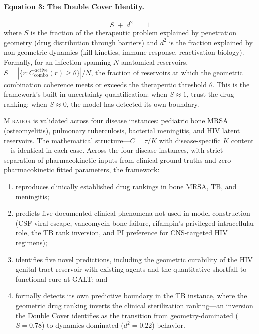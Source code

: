 \documentclass[11pt]{article}
\theoremstyle{plain}
\theoremstyle{definition}
\newcommand{\mirador}{\textsc{Mirador}}
\newcommand{\Ccombo}{C_{\mathrm{combo}}}
\begin{document}
\paragraph{Equation 3: The Double Cover Identity.}
%
\begin{equation}
  \label{eq:double-cover-preview}
  \boxed{\;S \;+\; d^2 \;=\; 1\;}
\end{equation}
%
where $S$ is the fraction of the therapeutic problem explained by
penetration geometry (drug distribution through barriers) and $d^2$
is the fraction explained by non-geometric dynamics (kill kinetics,
immune response, reactivation biology). Formally, for an infection
spanning $N$ anatomical reservoirs,
$S = |\{r : \Ccombo^{\,\mathrm{active}}(r) \geq \theta\}| / N$,
the fraction of reservoirs at which the geometric combination
coherence meets or exceeds the therapeutic threshold $\theta$.
This is the framework's built-in uncertainty quantification: when
$S \approx 1$, trust the drug ranking; when $S \approx 0$, the
model has detected its own boundary.

\medskip

\mirador{} is validated across four disease instances: pediatric bone
MRSA (osteomyelitis), pulmonary tuberculosis, bacterial meningitis,
and HIV latent reservoirs. The mathematical structure---$C = \tau/K$
with disease-specific $K$ content---is identical in each case. Across
the four disease instances, with strict separation of
pharmacokinetic inputs from clinical ground truths and zero
pharmacokinetic fitted parameters, the framework:
%
\begin{enumerate}
  \item reproduces clinically established drug rankings in bone
    MRSA, TB, and meningitis;
  \item predicts five documented clinical phenomena not used in model
    construction (CSF viral escape, vancomycin bone failure,
    rifampin's privileged intracellular role, the TB rank inversion,
    and PI preference for CNS-targeted HIV regimens);
  \item identifies five novel predictions, including the geometric
    curability of the HIV genital tract reservoir with existing
    agents and the quantitative shortfall to functional cure at
    GALT; and
  \item formally detects its own predictive boundary in the TB
    instance, where the geometric drug ranking inverts the clinical
    sterilization ranking---an inversion the Double Cover identifies
    as the transition from geometry-dominated ($S = 0.78$) to
    dynamics-dominated ($d^2 = 0.22$) behavior.
\end{enumerate}
\end{document}

